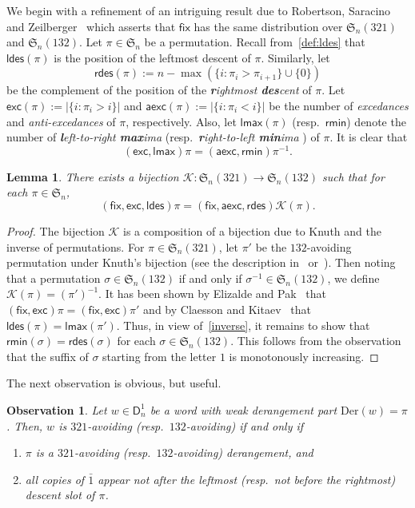 \documentclass[12pt]{amsart}
\numberwithin{equation}{section}
\theoremstyle{plain}
\newtheorem{lemma}[theorem]{Lemma}
\newtheorem{Observation}[theorem]{Observation}
\theoremstyle{definition}
\newcommand\D{\mathsf{D}}
\def\rmin{\mathsf{rmin}}
\def\lmax{\mathsf{lmax}}
\def\rdes{\mathsf{rdes}}
\def\Der{\mathrm{Der}}
\def\fix{\mathsf{fix}}
\def\max{\mathrm{max}}
\def\exc{\mathsf{exc}}
\def\aexc{\mathsf{aexc}}
\def\S{\mathfrak{S}}
\def\ldes{\mathsf{ldes}}
\def\max{\operatorname{max}}
\def\neg#1{{{{\bar#1}}}}
\begin{document}
We begin with  a refinement of  an intriguing  result due to Robertson,  Saracino and  Zeilberger~\cite{rsz} which asserts that $\fix$ has the same distribution over $\S_n(321)$ and $\S_n(132)$. Let $\pi\in\S_n$ be a permutation. Recall from~\eqref{def:ldes} that $\ldes(\pi)$ is the position of the  leftmost descent of $\pi$. Similarly, let 
$$
\rdes(\pi):=n-\max(\{i:\pi_i>\pi_{i+1}\}\cup\{0\})
$$
be the complement of the position of the {\em{\bf\em r}ightmost {\bf\em des}cent} of $\pi$. Let $\exc(\pi):=|\{i:\pi_i>i\}|$ and $\aexc(\pi):=|\{i:\pi_i<i\}|$ be the number of {\em excedances} and {\em anti-excedances} of $\pi$, respectively. Also, let  $\lmax(\pi)$ (resp.~$\rmin$) denote the number of {\em {\bf\em l}eft-to-right {\bf\em max}ima} (resp.~{\em {\bf\em r}ight-to-left {\bf\em min}ima} ) of $\pi$. It is clear that 
\begin{equation}\label{inverse}
(\exc,\lmax)\pi=(\aexc,\rmin)\pi^{-1}.
\end{equation}
\begin{lemma}\label{lem:knuth}
There exists a bijection $\mathcal{K}: \S_n(321)\rightarrow\S_n(132)$ such that for each $\pi\in\S_n$,
$$
(\fix,\exc,\ldes)\pi=(\fix,\aexc,\rdes)\mathcal{K}(\pi).
$$
\end{lemma}
\begin{proof}
The bijection $\mathcal{K}$ is a composition of a bijection due to Knuth and the inverse of permutations. For $\pi\in\S_n(321)$, let $\pi'$ be the $132$-avoiding permutation under Knuth's bijection (see the description in~\cite[Sec.~3.1]{ck} or~\cite{ep}). Then noting that a permutation $\sigma\in\S_n(132)$ if and only if $\sigma^{-1}\in\S_n(132)$, we define $\mathcal{K}(\pi)=(\pi')^{-1}$. It has been shown by Elizalde and Pak~\cite{ep} that $(\fix,\exc)\pi=(\fix,\exc)\pi'$ and by Claesson and  Kitaev~\cite[Sec.~6.4]{ck} that $\ldes(\pi)=\lmax(\pi')$. Thus, in view of~\eqref{inverse}, it remains to show that $\rmin(\sigma)=\rdes(\sigma)$ for each $\sigma\in\S_n(132)$. This follows from the observation that the suffix of $\sigma$ starting from the letter $1$ is monotonously increasing. 
\end{proof}

The next observation is obvious, but useful. 

\begin{Observation}\label{obser:der1}
Let $w\in\D_n^1$ be a word with weak derangement part $\Der(w)=\pi$. Then, $w$ is $321$-avoiding (resp.~$132$-avoiding) if and only if 
\begin{enumerate}
	\item $\pi$ is a $321$-avoiding (resp.~$132$-avoiding) derangement, and
	\item all copies of $\neg1$ appear not after  the leftmost  (resp.~not before the rightmost) descent slot of $\pi$.
\end{enumerate} 
\end{Observation}
\end{document}
